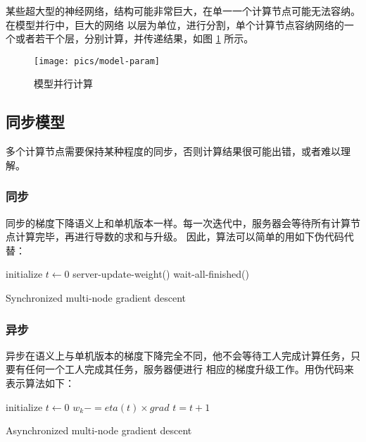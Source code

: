 \documentclass{ctexart}
\begin{document}
某些超大型的神经网络，结构可能非常巨大，在单一一个计算节点可能无法容纳。在模型并行中，巨大的网络
以层为单位，进行分割，单个计算节点容纳网络的一个或者若干个层，分别计算，并传递结果，如图 \ref{fig:model-param}
所示。

\begin{figure}
\centering
\texttt{[image: pics/model-param]}
\caption{模型并行计算}
\label{fig:model-param}
\end{figure}

\subsection{同步模型}

多个计算节点需要保持某种程度的同步，否则计算结果很可能出错，或者难以理解。

\subsubsection{同步}
同步的梯度下降语义上和单机版本一样。每一次迭代中，服务器会等待所有计算节点计算完毕，再进行导数的求和与升级。
因此，算法可以简单的用如下伪代码代替：

\begin{algorithm}[H]
	initialize $t \leftarrow 0$ \;
	 {
		server-update-weight()\;
		wait-all-finished()\;
	}
	\caption{Synchronized multi-node gradient descent}
\end{algorithm}

\subsubsection{异步}

异步在语义上与单机版本的梯度下降完全不同，他不会等待工人完成计算任务，只要有任何一个工人完成其任务，服务器便进行
相应的梯度升级工作。用伪代码来表示算法如下：

\begin{algorithm}[H]
	initialize $t \leftarrow 0$ \;
	 {
		$ w_k -= eta(t) \times grad$\;
		$t = t + 1$\;
	}
	\caption{Asynchronized multi-node gradient descent}
\end{algorithm}

\pagebreak

\end{document}

